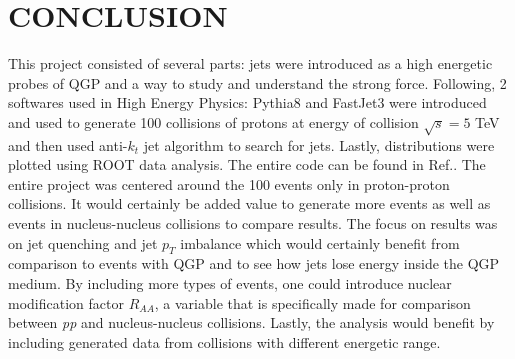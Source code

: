 \documentclass[a4paper,10pt]{article}
\begin{document}
\section{CONCLUSION}
This project consisted of several parts: jets were introduced as a high energetic probes of QGP and a way to study and understand the strong force. Following, 2 softwares used in High Energy Physics: Pythia8 and FastJet3 were introduced and used to generate 100 collisions of protons at energy of collision $\sqrt{s}=5$ TeV and then used anti-$k_t$ jet algorithm to search for jets. Lastly, distributions were plotted using ROOT data analysis. The entire code can be found in Ref.\cite{GitHubJets}.
\newline
\noindent The entire project was centered around the 100 events only in proton-proton collisions. It would certainly be added value to generate more events as well as events in nucleus-nucleus collisions to compare results. The focus on results was on jet quenching and jet $p_T$ imbalance which would certainly benefit from comparison to events with QGP and to see how jets lose energy inside the QGP medium. By including more types of events, one could introduce nuclear modification factor $R_{AA}$, a variable that is specifically made for comparison between \textit{pp} and nucleus-nucleus collisions. Lastly, the analysis would benefit by including generated data from collisions with different energetic range.

\fontsize{8}{9}\selectfont

{}
%



\clearpage
\end{document}
